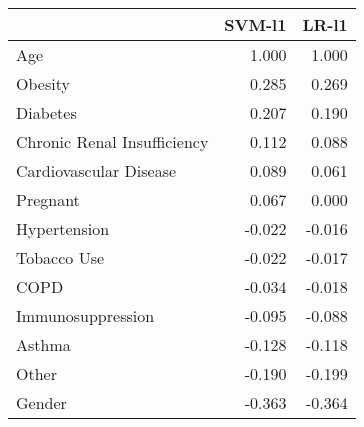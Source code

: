 \begin{tabular}{lrr}
\toprule
{} &  SVM-l1 &  LR-l1 \\
\midrule
Age                         &   1.000 &  1.000 \\
Obesity                     &   0.285 &  0.269 \\
Diabetes                    &   0.207 &  0.190 \\
Chronic Renal Insufficiency &   0.112 &  0.088 \\
Cardiovascular Disease      &   0.089 &  0.061 \\
Pregnant                    &   0.067 &  0.000 \\
Hypertension                &  -0.022 & -0.016 \\
Tobacco Use                 &  -0.022 & -0.017 \\
COPD                        &  -0.034 & -0.018 \\
Immunosuppression           &  -0.095 & -0.088 \\
Asthma                      &  -0.128 & -0.118 \\
Other                       &  -0.190 & -0.199 \\
Gender                      &  -0.363 & -0.364 \\
\bottomrule
\end{tabular}
